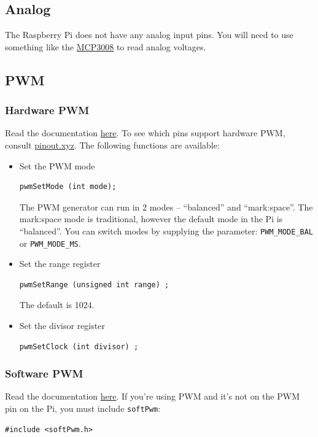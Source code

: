 \subsection{Analog}
The Raspberry Pi does not have any analog input pins. You will need to use something like the \href{https://cdn-shop.adafruit.com/datasheets/MCP3008.pdf}{MCP3008} to read analog voltages.

\subsection{PWM}
\subsubsection{Hardware PWM}
Read the documentation \href{http://wiringpi.com/reference/raspberry-pi-specifics/}{here}.
To see which pins support hardware PWM, consult \href{pinout.xyz}{pinout.xyz}.
The following functions are available:
\begin{itemize}
    \item Set the PWM mode
        \begin{lstlisting}[gobble=8]
        pwmSetMode (int mode);
        \end{lstlisting}
        The PWM generator can run in 2 modes – “balanced” and “mark:space”. The mark:space mode is traditional, however the default mode in the Pi is “balanced”. You can switch modes by supplying the parameter: \verb|PWM_MODE_BAL| or \verb|PWM_MODE_MS|.
    \item Set the range register
        \begin{lstlisting}[gobble=8]
        pwmSetRange (unsigned int range) ;
        \end{lstlisting}
        The default is 1024.
    \item Set the divisor register
        \begin{lstlisting}[gobble=8]
        pwmSetClock (int divisor) ;
        \end{lstlisting}
\end{itemize}
\subsubsection{Software PWM}
Read the documentation \href{http://wiringpi.com/reference/software-pwm-library/}{here}.
If you're using PWM and it's not on the PWM pin on the Pi, you must include \verb|softPwm|:
\begin{lstlisting}
#include <softPwm.h>
\end{lstlisting}

